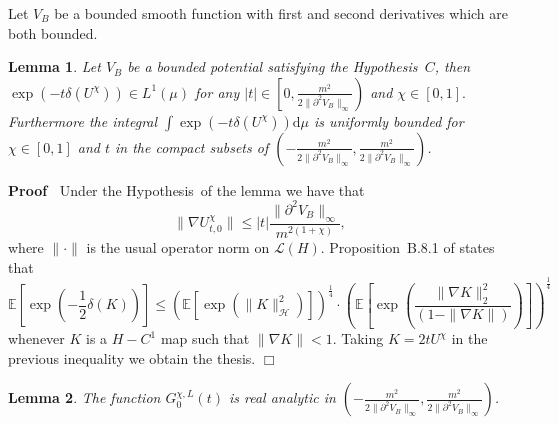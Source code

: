 \documentclass[a4paper,10pt]{article}
\newcommand{\mathd}{\mathrm{d}}
\newenvironment{proof}{\noindent\textbf{Proof\ }}{\hspace*{\fill}$\Box$\medskip}
\newtheorem{lemma}{Lemma}
\begin{document}
Let $V_B$ be a bounded smooth function with first and second derivatives which
are both bounded.

\begin{lemma}
  \label{lemma_chi1}Let $V_B$ be a bounded potential satisfying the
  Hypothesis~$C$, then $\exp (- t \delta (U^{\chi})) \in L^1 (\mu)$ for any $|
  t | \in \left[ 0, \frac{m^2}{2 \| \partial^2 V_B \|_{\infty}} \right)$ and
  $\chi \in [0, 1] .$ Furthermore the integral $\int \exp (- t \delta
  (U^{\chi})) \mathd \mu$ is uniformly bounded for $\chi \in [0, 1]$ and $t$
  in the compact subsets of $\left( - \frac{m^2}{2 \| \partial^2 V_B
  \|_{\infty}}, \frac{m^2}{2 \| \partial^2 V_B \|_{\infty}} \right)$.
\end{lemma}

\begin{proof}
  Under the Hypothesis~of the lemma we have that
  \[ \| \nabla U^{\chi}_{t, 0} \| \leqslant | t | \frac{\| \partial^2 V_B
     \|_{\infty}}{m^{2 (1 + \chi)}}, \]
  where $\| \cdot \|$ is the usual operator norm on $\mathcal{L} (H)$.
  Proposition~B.8.1 of {\cite{Ustunel2000}} states that
  \[ \mathbb{E} \left[ \exp \left( - \frac{1}{2} \delta (K) \right) \right]
     \leqslant (\mathbb{E} [\exp (\| K \|^2_{\mathcal{H}})])^{\frac{1}{4}}
     \cdot \left( \mathbb{E} \left[ \exp \left( \frac{\| \nabla K \|^2_2}{(1 -
     \| \nabla K \|)} \right) \right] \right)^{\frac{1}{4}} \]
  whenever $K$ is a $H - C^1$ map such that $\| \nabla K \| < 1$. Taking $K =
  2 t U^{\chi}$ in the previous inequality we obtain the thesis.
\end{proof}

\begin{lemma}
  \label{lemma_chi2}The function $G^{\chi, L}_0 (t)$ is real analytic in
  $\left( - \frac{m^2}{2 \| \partial^2 V_B \|_{\infty}}, \frac{m^2}{2 \|
  \partial^2 V_B \|_{\infty}} \right)$.
\end{lemma}
\end{document}

